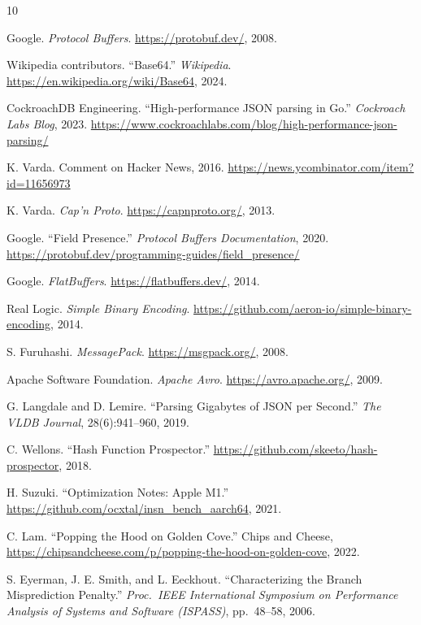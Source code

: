 \documentclass[11pt,onecolumn]{article}
\begin{document}
\begin{thebibliography}{10}

Google. \textit{Protocol Buffers}. \url{https://protobuf.dev/}, 2008.

Wikipedia contributors. ``Base64.'' \textit{Wikipedia}. \url{https://en.wikipedia.org/wiki/Base64}, 2024.

CockroachDB Engineering. ``High-performance JSON parsing in Go.'' \textit{Cockroach Labs Blog}, 2023. \url{https://www.cockroachlabs.com/blog/high-performance-json-parsing/}

K. Varda. Comment on Hacker News, 2016. \url{https://news.ycombinator.com/item?id=11656973}

K. Varda. \textit{Cap'n Proto}. \url{https://capnproto.org/}, 2013.

Google. ``Field Presence.'' \textit{Protocol Buffers Documentation}, 2020. \url{https://protobuf.dev/programming-guides/field_presence/}

Google. \textit{FlatBuffers}. \url{https://flatbuffers.dev/}, 2014.

Real Logic. \textit{Simple Binary Encoding}. \url{https://github.com/aeron-io/simple-binary-encoding}, 2014.

S. Furuhashi. \textit{MessagePack}. \url{https://msgpack.org/}, 2008.

Apache Software Foundation. \textit{Apache Avro}. \url{https://avro.apache.org/}, 2009.

G. Langdale and D. Lemire. ``Parsing Gigabytes of JSON per Second.'' \textit{The VLDB Journal}, 28(6):941--960, 2019.

C. Wellons. ``Hash Function Prospector.'' \url{https://github.com/skeeto/hash-prospector}, 2018.

H. Suzuki. ``Optimization Notes: Apple M1.'' \url{https://github.com/ocxtal/insn_bench_aarch64}, 2021.

C. Lam. ``Popping the Hood on Golden Cove.'' Chips and Cheese, \url{https://chipsandcheese.com/p/popping-the-hood-on-golden-cove}, 2022.

S. Eyerman, J. E. Smith, and L. Eeckhout. ``Characterizing the Branch Misprediction Penalty.'' \textit{Proc.\ IEEE International Symposium on Performance Analysis of Systems and Software (ISPASS)}, pp.\ 48--58, 2006.


\end{thebibliography}
\end{document}
